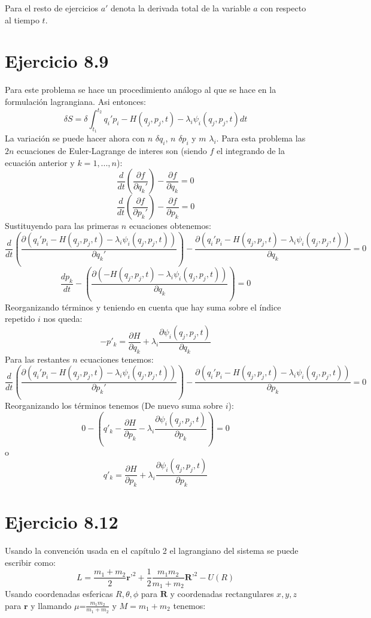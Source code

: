 \documentclass[letterpaper,10pt]{article}
\begin{document}
Para el resto de ejercicios $a'$ denota la derivada total de la variable $a$ con respecto al tiempo $t$.\\


\section*{Ejercicio 8.9}
Para este problema se hace un procedimiento an\'alogo al que se hace en la formulaci\'on lagrangiana. Asi entonces:
$$
\delta S=\delta \int_{t_1}^{t_2} q_i' p_i-H(q_j,p_j,t)-\lambda_i \psi_i(q_j,p_j,t)dt
$$
La variaci\'on se puede hacer  ahora con $n$ $\delta q_i$, $n$ $\delta p_i$ y $m$ $\lambda_i$.
Para esta problema las $2n$ ecuaciones de Euler-Lagrange de interes son (siendo $f$ el integrando de la ecuaci\'on anterior y $k=1,...,n$):
$$
\frac{d}{dt}\left( \frac{\partial f}{\partial q_k'}\right)-\frac{\partial f}{\partial q_k}=0$$ $$
\frac{d}{dt}\left( \frac{\partial f}{\partial p_k'}\right)-\frac{\partial f}{\partial p_k}=0
$$
Sustituyendo para las primeras $n$ ecuaciones obtenemos:
$$
\frac{d}{dt}\left( \frac{\partial (q_i' p_i-H(q_j,p_j,t)-\lambda_i \psi_i(q_j,p_j,t))}{\partial q_k'}\right)-\frac{\partial (q_i' p_i-H(q_j,p_j,t)-\lambda_i \psi_i(q_j,p_j,t))}{\partial q_k}=0$$ $$
\frac{d p_k}{dt}-(\frac{\partial (-H(q_j,p_j,t)-\lambda_i \psi_i(q_j,p_j,t))}{\partial q_k})=0
$$
Reorganizando t\'erminos  y teniendo en cuenta que hay suma sobre el \'indice repetido $i$ nos queda:
$$
-p'_k=\frac{\partial H}{\partial q_k}+\lambda_i \frac{\partial \psi_i(q_j,p_j,t)}{\partial q_k}
$$
Para las restantes $n$ ecuaciones tenemos:
$$
\frac{d}{dt}\left( \frac{\partial (q_i' p_i-H(q_j,p_j,t)-\lambda_i \psi_i(q_j,p_j,t))}{\partial p_k'}\right)-\frac{\partial (q_i' p_i-H(q_j,p_j,t)-\lambda_i \psi_i(q_j,p_j,t))}{\partial p_k}=0
$$
Reorganizando los t\'erminos tenemos (De nuevo suma sobre $i$):
$$0-\left(q'_k-\frac{\partial H}{\partial p_k}-\lambda_i \frac{\partial \psi_i(q_j,p_j,t)}{\partial p_k}\right)=0$$ o $$q'_k =\frac{\partial H}{\partial p_k}+\lambda_i \frac{\partial \psi_i(q_j,p_j,t)}{\partial p_k} $$

\section*{Ejercicio 8.12}
Usando la convenci\'on usada en el cap\'itulo 2 el lagrangiano del sistema se puede escribir como:
$$ L=\frac{m_1+m_2}{2} \textbf{r'}^2+\frac{1}{2}\frac{m_1 m_2}{m_1+m_2} \textbf{R'}^2-U(R)$$
Usando coordenadas esfericas $R,\theta,\phi$ para $\textbf{R}$ y coordenadas rectangulares $x,y,z$ para $\textbf{r}$ y llamando $\mu$=$\frac{m_1 m_2}{m_1+m_2}$ y $M=m_1+m_2$ tenemos:
\end{document}

